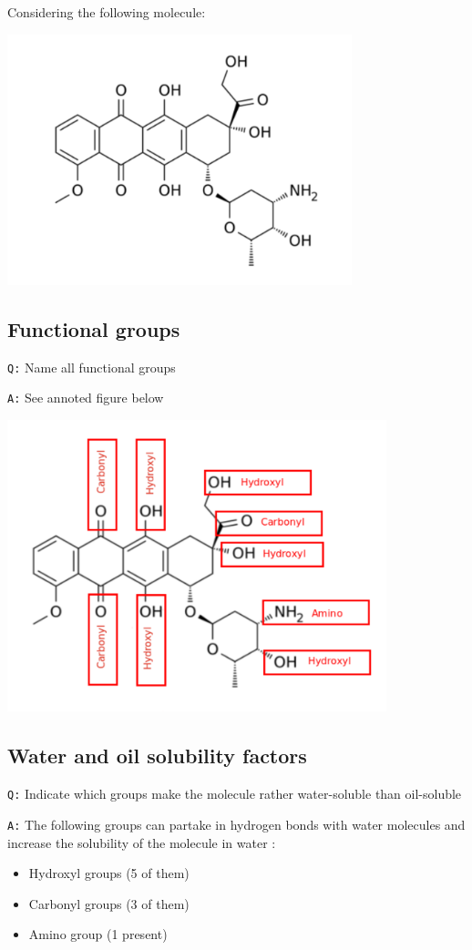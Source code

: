 \documentclass[11pt, a4paper,titlepage]{article}
\begin{document}
Considering the following molecule:

\includegraphics[width=10cm]{./Figures/Part3MoleculeRaw.pdf}
\subsection{Functional groups}
\label{sec-3-1}

\texttt{Q:} Name all functional groups

\texttt{A:} See annoted figure below

\includegraphics[width=11cm]{./Figures/Part3MoleculeFunctionalGroups.pdf}
\subsection{Water and oil solubility factors}
\label{sec-3-2}

\texttt{Q:} Indicate which groups make the molecule rather water-soluble
than oil-soluble

\texttt{A:} The following groups can partake in hydrogen bonds with water
molecules and increase the solubility of the molecule in water :

\begin{itemize}
\item Hydroxyl groups (5 of them)
\item Carbonyl groups (3 of them)
\item Amino group (1 present)
\end{itemize}
\end{document}
